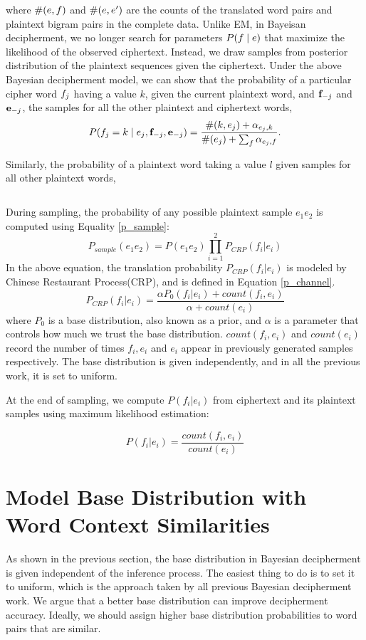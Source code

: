 where $\#(e,f)$ and $\#(e,e')$ are the counts of the translated word pairs and plaintext bigram pairs in the complete data. Unlike EM, in Bayeisan decipherment, we no longer search for parameters $P(f \mid e)$ that maximize the likelihood of the observed ciphertext. Instead, we draw samples from posterior distribution of the plaintext sequences given the ciphertext. Under the above Bayesian decipherment model, we can show that the probability of a particular cipher word $f_{j}$ having a value $k$, given the current plaintext word, and $\mathbf{f}_{-j}$ and $\mathbf{e}_{-j}$, the samples for all the other plaintext and ciphertext words, 
\begin{equation*}
P(f_j = k \mid e_j,\mathbf{f}_{-j}, \mathbf{e}_{-j}) = \frac{\#(k, e_j) + \alpha_{e_j,k}}{\#(e_j)+\sum_{f} \alpha_{e_j,f}}.
\end{equation*}

Similarly, the probability of a plaintext word taking a value $l$ given samples for all other plaintext words, 

\begin{equation}
\end{equation}

During sampling, the probability of any possible plaintext sample $e_{1}e_{2}$ is computed using Equality \ref{p_sample}:
%
\[
\label{p_sample}
P_{sample}(e_{1}e_{2}) =  P(e_{1}e_{2}) \prod_{i=1}^{2}P_{CRP}(f_{i}|e_{i})
\]
%
In the above equation, the translation probability $P_{CRP}(f_{i}|e_{i})$ is modeled by Chinese Restaurant Process(CRP), and is defined in Equation \ref{p_channel}.
%
\[
\label{p_channel}
P_{CRP}(f_{i}|e_{i}) = \frac{\alpha P_0(f_{i}|e_{i})+count(f_{i},e_{i})}{\alpha+count(e_{i})}
\]
%
where $P_{0}$ is a base distribution, also known as a prior, and $\alpha$ is a parameter that controls how much we trust the base distribution. $count(f_{i},e_{i})$ and $count(e_{i})$ record the number of times $f_{i},e_{i}$ and $e_{i}$ appear in previously generated samples respectively. The base distribution is given independently, and in all the previous work, it is set to uniform.

At the end of sampling, we compute $P(f_{i}|e_{i})$ from ciphertext and its plaintext samples using maximum likelihood estimation:

\[
\label{mlh_estimation}
P(f_{i}|e_{i}) =  \frac{count(f_{i},e_{i})}{count(e_{i})}
\]

\section{Model Base Distribution with Word Context Similarities}
As shown in the previous section, the base distribution in Bayesian decipherment is given independent of the inference process. The easiest thing to do is to set it to uniform, which is the approach taken by all previous Bayesian decipherment work. We argue that a better base distribution can improve decipherment accuracy. Ideally, we should assign higher base distribution probabilities to word pairs that are similar.

